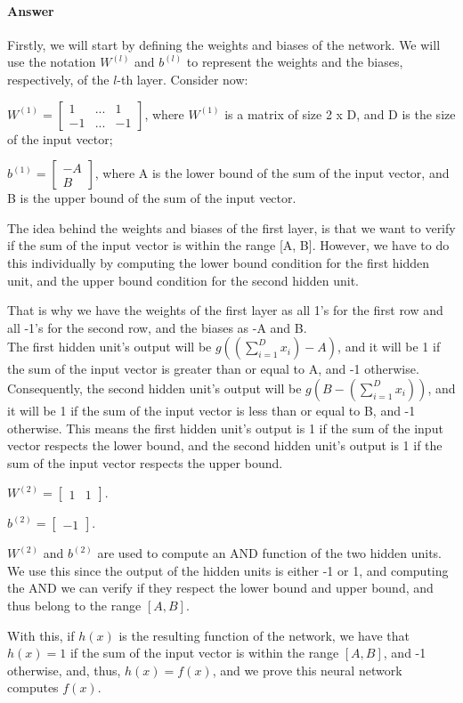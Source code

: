 \documentclass{article}
\begin{document}
\paragraph{Answer}

Firstly, we will start by defining the weights and biases of the network. We will use the notation
\( W^{(l)} \) and \( b^{(l)} \) to represent the weights and the biases, respectively, of the \( l \)-th layer. 
Consider now: 

\( W^{(1)} = \begin{bmatrix}
    1  & ... & 1  \\
    -1 & ... & -1
\end{bmatrix}
\), where \(W^{(1)}\) is a matrix of size 2 x D, and D is the size of the input vector; 

\(b^{(1)} = \begin{bmatrix}
    -A \\
    B
\end{bmatrix}
\), where A is the lower bound of the sum of the input vector, and B is the upper bound of the sum of the input vector. 

The idea behind the weights and biases of the first layer, is that we want to verify if the sum of the input vector is within the range [A, B].
However, we have to do this individually by computing the lower bound condition for the first hidden unit, and the upper bound condition for the second hidden unit. 

That is why we have the weights of the first layer as all 1's for the first row and all -1's for the second row, and the biases as -A and B. \\
The first hidden unit's output will be $g((\sum_{i=1}^{D} x_i) - A)$, and it will be 1 if the sum of the input vector is greater than or equal to A,
and -1 otherwise. Consequently, the second hidden unit's output will be $g(B - (\sum_{i=1}^{D} x_i))$, and it will be 1 if the sum of the input vector is less than or equal to B,
and -1 otherwise. This means the first hidden unit's output is 1 if the sum of the input vector respects the lower bound,
and the second hidden unit's output is 1 if the sum of the input vector respects the upper bound. 

\( W^{(2)} = \begin{bmatrix}
    1 & 1
\end{bmatrix}
\).

\(b^{(2)} = \begin{bmatrix}
    -1
\end{bmatrix}
\).

\(W^{(2)}\) and \(b^{(2)}\) are used to compute an AND function of the two hidden units. We use this since the output of
the hidden units is either -1 or 1, and computing the AND we can verify if they respect the lower bound and upper bound, and thus
belong to the range \([A, B]\). 

With this, if \(h(x)\) is the resulting function of the network, we have that \(h(x) = 1\) if the sum of the input vector is within the range \([A, B]\),
and -1 otherwise, and, thus, \(h(x) = f(x)\), and we prove this neural network computes \(f(x)\).
\end{document}
